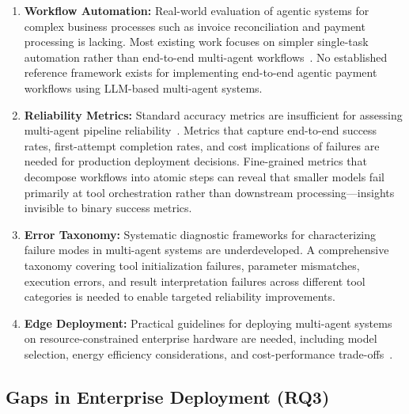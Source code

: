 \begin{enumerate}[leftmargin=*]
    \item \textbf{Workflow Automation:} Real-world evaluation of agentic systems for complex business processes such as invoice reconciliation and payment processing is lacking. Most existing work focuses on simpler single-task automation rather than end-to-end multi-agent workflows~\cite{wang2024surveyllm-mas}. No established reference framework exists for implementing end-to-end agentic payment workflows using LLM-based multi-agent systems.
    
    \item \textbf{Reliability Metrics:} Standard accuracy metrics are insufficient for assessing multi-agent pipeline reliability~\cite{kokane2024spectool,kapoor2024ai}. Metrics that capture end-to-end success rates, first-attempt completion rates, and cost implications of failures are needed for production deployment decisions. Fine-grained metrics that decompose workflows into atomic steps can reveal that smaller models fail primarily at tool orchestration rather than downstream processing---insights invisible to binary success metrics.
    
    \item \textbf{Error Taxonomy:} Systematic diagnostic frameworks for characterizing failure modes in multi-agent systems are underdeveloped. A comprehensive taxonomy covering tool initialization failures, parameter mismatches, execution errors, and result interpretation failures across different tool categories is needed to enable targeted reliability improvements.
    
    \item \textbf{Edge Deployment:} Practical guidelines for deploying multi-agent systems on resource-constrained enterprise hardware are needed, including model selection, energy efficiency considerations, and cost-performance trade-offs~\cite{dhar2024empirical}.
\end{enumerate}

\subsection{Gaps in Enterprise Deployment (RQ3)}

